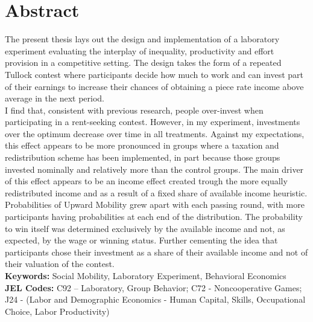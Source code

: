 \chapter*{Abstract}

The present thesis lays out the design and implementation of a laboratory experiment evaluating the interplay of inequality, productivity and effort provision in a competitive setting. The design takes the form of a repeated Tullock contest where participants decide how much to work and can invest part of their earnings to increase their chances of obtaining a piece rate income above average in the next period.\\

I find that, consistent with previous research, people over-invest when participating in a rent-seeking contest. However, in my experiment, investments over the optimum decrease over time in all treatments. Against my expectations, this effect appears to be more pronounced in groups where a taxation and redistribution scheme has been implemented, in part because those groups invested nominally and relatively more than the control groups. The main driver of this effect appears to be an income effect created trough the more equally redistributed income and as a result of a fixed share of available income heuristic.\\

Probabilities of Upward Mobility grew apart with each passing round, with more participants having probabilities at each end of the distribution. The probability to win itself was determined exclusively by the available income and not, as expected, by the wage or winning status. Further cementing the idea that participants chose their investment as a share of their available income and not of their valuation of the contest.\\


\textbf{Keywords:} Social Mobility, Laboratory Experiment, Behavioral Economics\\

\textbf{JEL Codes:} 
C92 – Laboratory, Group Behavior; C72 - Noncooperative Games;
J24 - (Labor and Demographic Economics - Human Capital, Skills, Occupational Choice, Labor Productivity)\\